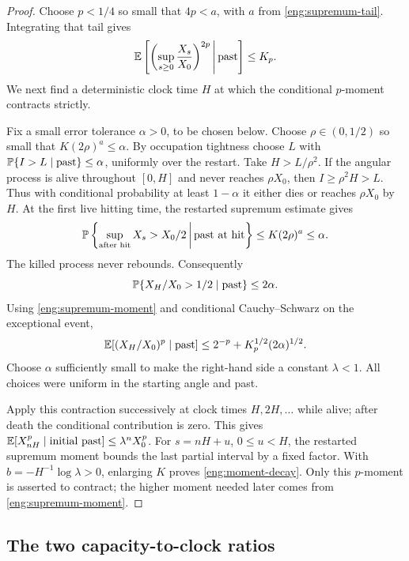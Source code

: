 \begin{proof}
Choose $p<1/4$ so small that $4p<a$, with $a$ from
\eqref{eng:supremum-tail}.  Integrating that tail gives
\begin{equation}\label{eng:supremum-moment}
 \mathbb E\left[\left(\sup_{s\ge0}\frac{X_s}{X_0}\right)^{2p}
          \,\middle|\,\text{past}\right]\le K_p.
\end{equation}
We next find a deterministic clock time $H$ at which the conditional
$p$-moment contracts strictly.

Fix a small error tolerance $\alpha>0$, to be chosen below.  Choose
$\rho\in(0,1/2)$ so small that $K(2\rho)^a\le\alpha$.  By occupation
tightness choose $L$ with
$\mathbb P\{I>L\mid\text{past}\}\le\alpha$, uniformly over the restart.
Take $H>L/\rho^2$.  If the angular process is alive throughout $[0,H]$
and never reaches $\rho X_0$, then $I\ge\rho^2H>L$.  Thus with
conditional probability at least $1-\alpha$ it either dies or reaches
$\rho X_0$ by $H$.  At the first live hitting time, the restarted
supremum estimate gives
\[
 \mathbb P\left\{\sup_{\text{after hit}}X_s>X_0/2
        \,\middle|\,\text{past at hit}\right\}
 \le K(2\rho)^a\le\alpha.
\]
The killed process never rebounds.  Consequently
\begin{equation}\label{eng:half-probability}
 \mathbb P\{X_H/X_0>1/2\mid\text{past}\}\le2\alpha.
\end{equation}
Using \eqref{eng:supremum-moment} and conditional Cauchy--Schwarz on the
exceptional event,
\[
 \mathbb E[(X_H/X_0)^p\mid\text{past}]
 \le 2^{-p}+K_p^{1/2}(2\alpha)^{1/2}.
\]
Choose $\alpha$ sufficiently small to make the right-hand side a
constant $\lambda<1$.  All choices were uniform in the starting angle
and past.

Apply this contraction successively at clock times $H,2H,\ldots$ while
alive; after death the conditional contribution is zero.  This gives
$\mathbb E[X_{nH}^p\mid\text{initial past}]\le\lambda^nX_0^p$.  For
$s=nH+u$, $0\le u<H$, the restarted supremum moment bounds the last
partial interval by a fixed factor.  With
$b=-H^{-1}\log\lambda>0$, enlarging $K$ proves
\eqref{eng:moment-decay}.  Only this $p$-moment is asserted to contract;
the higher moment needed later comes from
\eqref{eng:supremum-moment}.
\end{proof}

\subsection{The two capacity-to-clock ratios}

